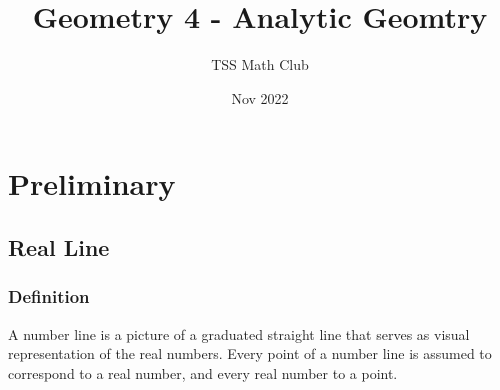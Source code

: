 \documentclass{article}
\title{Geometry 4 - Analytic Geomtry}
\author{TSS Math Club}
\date{Nov 2022}
\begin{document}
\large

\maketitle

\section{Preliminary}




\subsection{Real Line}

\subsubsection{Definition}

A number line is a picture of a graduated straight line that serves as visual representation of the real numbers. Every point of a number line is assumed to correspond to a real number, and every real number to a point.



\end{document}
